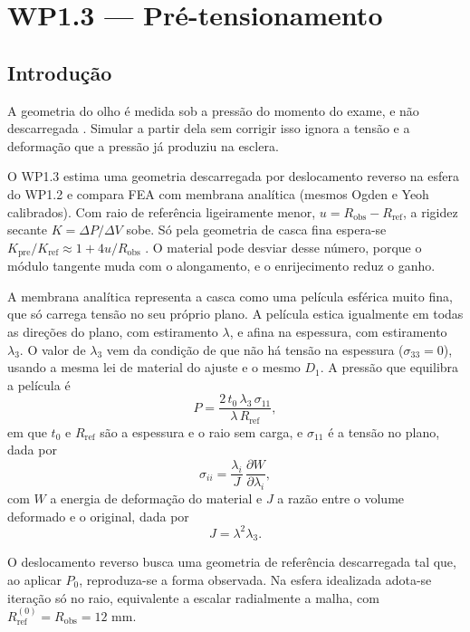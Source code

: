 \section{WP1.3 --- Pré-tensionamento}

\subsection{Introdução}

A geometria do olho é medida sob a pressão do momento do exame, e não descarregada \citep{grytz2013}. Simular a partir dela sem corrigir isso ignora a tensão e a deformação que a pressão já produziu na esclera.

O WP1.3 estima uma geometria descarregada por deslocamento reverso na esfera do WP1.2 e compara FEA com membrana analítica (mesmos Ogden e Yeoh calibrados). Com raio de referência ligeiramente menor, $u=R_{\text{obs}}-R_{\text{ref}}$, a rigidez secante $K=\Delta P/\Delta V$ sobe. Só pela geometria de casca fina espera-se $K_{\text{pre}}/K_{\text{ref}}\approx1+4u/R_{\text{obs}}$ \citep{timoshenko1959}. O material pode desviar desse número, porque o módulo tangente muda com o alongamento, e o enrijecimento reduz o ganho.

A membrana analítica representa a casca como uma película esférica muito fina, que só carrega tensão no seu próprio plano. A película estica igualmente em todas as direções do plano, com estiramento $\lambda$, e afina na espessura, com estiramento $\lambda_3$. O valor de $\lambda_3$ vem da condição de que não há tensão na espessura ($\sigma_{33}=0$), usando a mesma lei de material do ajuste e o mesmo $D_1$. A pressão que equilibra a película é
\begin{equation}
P=\frac{2\,t_0\,\lambda_3\,\sigma_{11}}{\lambda\,R_{\text{ref}}},
\label{eq:membrana}
\end{equation}
em que $t_0$ e $R_{\text{ref}}$ são a espessura e o raio sem carga, e $\sigma_{11}$ é a tensão no plano, dada por
\begin{equation}
\sigma_{ii}=\frac{\lambda_i}{J}\,\frac{\partial W}{\partial\lambda_i},
\label{eq:tensao_plano}
\end{equation}
com $W$ a energia de deformação do material e $J$ a razão entre o volume deformado e o original, dada por
\begin{equation}
J=\lambda^2\lambda_3.
\label{eq:jacobiano}
\end{equation}

O deslocamento reverso \citep{bols2013} busca uma geometria de referência descarregada tal que, ao aplicar $P_0$, reproduza-se a forma observada. Na esfera idealizada adota-se iteração só no raio, equivalente a escalar radialmente a malha, com $R_{\text{ref}}^{(0)}=R_{\text{obs}}=12$ mm.


